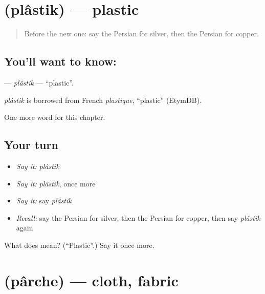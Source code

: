 \section[\texorpdfstring{\fa{پلاستیک} (plâstik)}{پلاستیک (plâstik)}]{ (plâstik) — plastic}

\label{lesson:FA-C173-plastik}



\begin{quote}
Before the new one: say the Persian for silver, then the Persian for copper.
\end{quote}

\subsection*{You'll want to know: }
\textbf{} — \emph{plâstik} — \textquotedblleft{}plastic\textquotedblright{}.

\begin{cousinweb}
\emph{plâstik} is borrowed from French \emph{plastique}, \textquotedblleft{}plastic\textquotedblright{} (EtymDB).
\end{cousinweb}

\begin{grammarlens}[title={What you've built}]
One more word for this chapter.
\end{grammarlens}

\subsection*{Your turn}
\begin{itemize}
\raggedright
  \item \emph{Say it:} \emph{plâstik}
  \item \emph{Say it:} \emph{plâstik}, once more
  \item \emph{Say it:} say \emph{plâstik}
  \item \emph{Recall:} say the Persian for silver, then the Persian for copper, then say \emph{plâstik} again
\end{itemize}

\begin{tcolorbox}[breakable,colback=teal!4,colframe=teal!35!black,title={Before you move on}]
What does  mean? (\textquotedblleft{}Plastic\textquotedblright{}.) Say it once more.
\end{tcolorbox}
\section[\texorpdfstring{\fa{پارچه} (pârche)}{پارچه (pârche)}]{ (pârche) — cloth, fabric}


